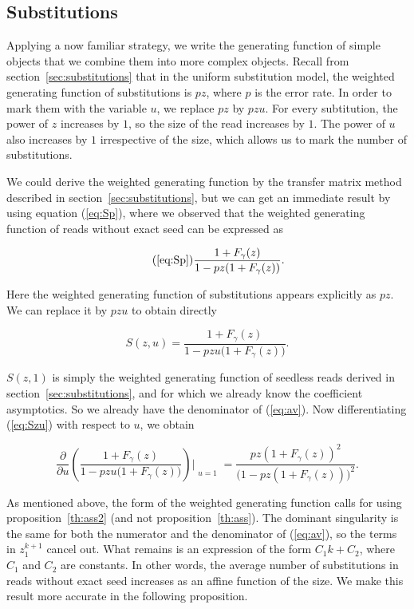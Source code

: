 \documentclass{article}
\begin{document}
\subsection{Substitutions}
\label{sec:avsub}

Applying a now familiar strategy, we write the generating function of
simple objects that we combine them into more complex objects. Recall from
section~\ref{sec:substitutions} that in the uniform substitution model,
the weighted generating function of substitutions is $pz$, where $p$ is
the error rate. In order to mark them with the variable $u$, we replace
$pz$ by $pzu$. For every subtitution, the power of $z$ increases by $1$,
so the size of the read increases by $1$. The power of $u$ also increases
by $1$ irrespective of the size, which allows us to mark the number of
substitutions.

We could derive the weighted generating function by the transfer matrix
method described in section~\ref{sec:substitutions}, but we can get an
immediate result by using equation (\ref{eq:Sp}), where we observed
that the weighted generating function of reads without exact seed can
be expressed as

\begin{equation}
\tag{\ref{eq:Sp}}
\frac{1+F_\gamma(z)}{1-pz(1+F_\gamma(z))}.
\end{equation}

Here the weighted generating function of substitutions appears explicitly
as $pz$. We can replace it by $pzu$ to obtain directly

\begin{equation}
\label{eq:Szu}
S(z,u) = \frac{1+F_\gamma(z)}{1-pzu\big( 1+F_\gamma(z) \big)}.
\end{equation}


$S(z,1)$ is simply the weighted generating function of seedless reads
derived in section~\ref{sec:substitutions}, and for which we already
know the coefficient asymptotics. So we already have the denominator of
(\ref{eq:av}). Now differentiating (\ref{eq:Szu}) with respect to $u$, we
obtain

\begin{equation}
\label{eq:dSdu}
\frac{\partial }{\partial u}
\left(\frac{1+F_\gamma(z)}{1-pzu\big( 1+F_\gamma(z) \big)}
\right) \Biggr|_{\substack{\\u=1}} = 
\frac{pz(1+F_\gamma(z))^2}{\big( 1 - pz(1+F_\gamma(z)) \big)^2}.
\end{equation}

As mentioned above, the form of the weighted generating function calls for
using proposition~\ref{th:ass2} (and not proposition~\ref{th:ass}). The
dominant singularity is the same for both the numerator and the
denominator of (\ref{eq:av}), so the terms in $z_1^{k+1}$ cancel out. What
remains is an expression of the form $C_1k + C_2$, where $C_1$ and $C_2$
are constants. In other words, the average number of substitutions in
reads without exact seed increases as an affine function of the size. We
make this result more accurate in the following proposition.
\end{document}
